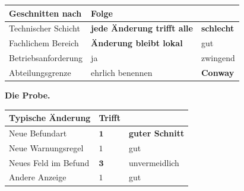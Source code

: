 \begin{merksatz}
\begin{center}
{\small
\renewcommand{\arraystretch}{1.5}
\begin{tabular}{@{}P{3.0cm}P{2.4cm}P{2.6cm}@{}}
\toprule
\textbf{Geschnitten nach} & \textbf{Folge} & \\
\midrule
Technischer Schicht & \textcolor{akzent}{\textbf{jede Änderung trifft alle}} & \textcolor{akzent}{\textbf{schlecht}}\\
Fachlichem Bereich & \textcolor{gruen}{\textbf{Änderung bleibt lokal}} & \textcolor{gruen}{gut}\\
Betriebs\-anforderung & \textcolor{gruen}{ja} & \textcolor{gruen}{zwingend}\\
Abteilungsgrenze & \textcolor{mittel}{ehrlich benennen} & \textbf{Conway}\\
\bottomrule
\end{tabular}}
\end{center}

\begin{center}
\begin{minipage}{0.88\textwidth}
\end{minipage}
\end{center}

\textbf{Die Probe.}

\begin{center}
\renewcommand{\arraystretch}{1.45}
\begin{tabular}{@{}P{3.0cm}P{2.2cm}P{2.8cm}@{}}
\toprule
\textbf{Typische Änderung} & \textbf{Trifft} & \\
\midrule
Neue Befundart & $\mathbf{1}$ & \textcolor{gruen}{\textbf{guter Schnitt}}\\
Neue Warnungsregel & $1$ & \textcolor{gruen}{gut}\\
Neues Feld im Befund & $\mathbf{3}$ & \textcolor{mittel}{unvermeidlich}\\
Andere Anzeige & $1$ & \textcolor{gruen}{gut}\\
\bottomrule
\end{tabular}
\end{center}

\begin{center}
\end{center}


\end{merksatz}
